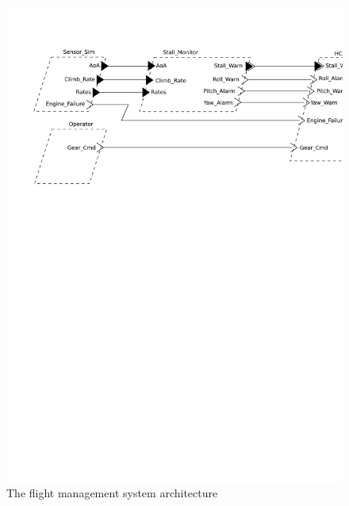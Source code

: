 \begin{figure}
\centering
\includegraphics[scale=0.5]{figs/caseStudy}
\caption{The flight management system architecture}
\label{fig:case_study}
\end{figure}

